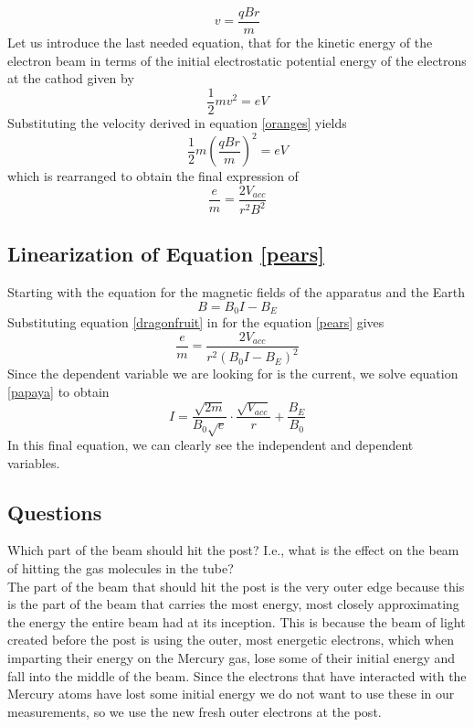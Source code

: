 \documentclass[aps,prl,10pt,twocolumn,floatfix]{revtex4-2}
\begin{document}
\begin{equation}\label{oranges}
v=\frac{qBr}{m}
\end{equation}
Let us introduce the last needed equation, that for the kinetic energy of the electron beam in terms of the initial electrostatic potential energy of the electrons at the cathod given by
\begin{equation}
\frac{1}{2}mv^2=eV
\end{equation}
Substituting the velocity derived in equation \ref{oranges} yields
\begin{equation*}
\frac{1}{2}m(\frac{qBr}{m})^2=eV
\end{equation*}
which is rearranged to obtain the final expression of
\begin{equation}\label{blueberries}
\frac{e}{m}=\frac{2V_{acc}}{r^2B^2}
\end{equation}

\subsection{Linearization of Equation \ref{pears}}
Starting with the equation for the magnetic fields of the apparatus and the Earth
\begin{equation}\label{dragonfruit}
B=B_0I-B_E
\end{equation}
Substituting equation \ref{dragonfruit} in for the equation \ref{pears} gives
\begin{equation*}\label{papaya}
\frac{e}{m}=\frac{2V_{acc}}{r^2(B_0I-B_E)^2}
\end{equation*}
Since the dependent variable we are looking for is the current, we  solve equation \ref{papaya} to obtain
\begin{equation}
I=\frac{\sqrt{2m}}{B_0\sqrt{e}}\cdot \frac{\sqrt{V_{acc}}}{r}+\frac{B_E}{B_0}
\end{equation}
In this final equation, we can clearly see the independent and dependent variables.
\subsection{Questions}
Which part of the beam should hit the post? I.e., what is the effect on the beam of hitting the gas
molecules in the tube?\\
The part of the beam that should hit the post is the very outer edge because this is the part of the beam that carries the most energy, most closely approximating the energy the entire beam had at its inception.
This is because the beam of light created before the post is using the outer, most energetic electrons, which when imparting their energy on the Mercury gas, lose some of their initial energy and fall into the middle of the beam.
Since the electrons that have interacted with the Mercury atoms have lost some initial energy we do not want to use these in our measurements, so we use the new fresh outer electrons at the post.
\end{document}
